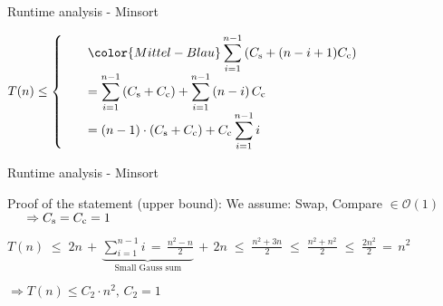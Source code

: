 \begin{frame}{Runtime analysis - Minsort}
  \begin{center}
    \begin{math}
      T(n) \leq
      \left\lbrace
      \begin{array}{l}
      \displaystyle\hspace*{1.5em}\color{Mittel-Blau}
        \sum^{n - 1}_{i = 1} \left(C_\text{s} + (n - i + 1) C_\text{c}\right)\\
      \displaystyle\hspace*{1.5em}
        = \sum^{n - 1}_{i = 1} \left(C_\text{s} + C_\text{c}\right)
        + \sum^{n - 1}_{i = 1} \left(n - i\right) C_\text{c}\\
      \displaystyle\hspace{1.5em}
        = \left(n - 1\right) \cdot \left(C_\text{s} + C_\text{c}\right)
        + C_\text{c} \sum_{i = 1}^{n - 1} i\\
      \end{array}
      \right.
    \end{math}
  \end{center}
\end{frame}


\begin{frame}{Runtime analysis - Minsort}
  \begin{block}{Proof of the statement ({\color{Mittel-Gruen}upper bound}):}
    We assume: Swap, Compare $\in \mathcal{O}(1)$\\
    $\hspace{1.5em}\Rightarrow C_\text{s} = C_\text{c} = 1$
    \vspace*{0.5em}
    \begin{center}
      $\displaystyle
      T(n)
      \;\leq\;
        2 n \, + \, \underbrace{
          \sum \limits^{n - 1}_{i = 1} i
          \,=\, \frac{n^2 - n}{2}
        }_\text{Small Gauss sum}
        \, + \,2  n
      \;\leq\; \frac{n^2 + 3 n}{2}
      \;\leq\; \frac{n^2 + n^2}{2}
      \;\leq\; \frac{2 n^2}{2}
      \,=\, n^2
      $
    \end{center}
    $\Rightarrow T(n) \leq C_2 \cdot n^2, \, C_2 = 1$
  \end{block}
\end{frame}

